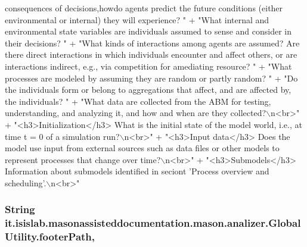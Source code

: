 \begin{DoxyCode}
{       consequences of decisions,howdo agents predict the future conditions (either environmental or internal)
       they will experience? "}
                                             +                            \textcolor{stringliteral}{"What internal and environmental
       state variables are individuals assumed to sense and consider in their decisions? "}
                                             +                            \textcolor{stringliteral}{"What kinds of interactions among
       agents are assumed? Are there direct interactions in which individuals encounter and affect others, or are
       interactions indirect, e.g., via competition for amediating resource? "}
                                             +                            \textcolor{stringliteral}{"What processes are modeled by
       assuming they are random or partly random? "}
                                             +                            \textcolor{stringliteral}{"Do the individuals form or
       belong to aggregations that affect, and are affected by, the individuals? "}
                                             +                            \textcolor{stringliteral}{"What data are collected from the
       ABM for testing, understanding, and analyzing it, and how and when are they collected?\(\backslash\)n<br>"}
                                             + \textcolor{stringliteral}{"<h3>Initialization</h3> What is the initial state of the
       model world, i.e., at time t = 0 of a simulation run?\(\backslash\)n<br>"}
                                             + \textcolor{stringliteral}{"<h3>Input data</h3> Does the model use input from external
       sources such as data files or other models to represent processes that change over time?\(\backslash\)n<br>"}
                                             + \textcolor{stringliteral}{"<h3>Submodels</h3> Information about submodels identified
       in seciont 'Process overview and scheduling'.\(\backslash\)n<br>"}
\end{DoxyCode}
\hypertarget{classit_1_1isislab_1_1masonassisteddocumentation_1_1mason_1_1analizer_1_1_global_utility_ae94176856fb4ef24dfaa70423f5fc3f9}{
\subsubsection[{footer\-Path}]{\setlength{\rightskip}{0pt plus 5cm}String it.\-isislab.\-masonassisteddocumentation.\-mason.\-analizer.\-Global\-Utility.\-footer\-Path\hspace{0.3cm}{\ttfamily [static]}, {\ttfamily [package]}}}\label{classit_1_1isislab_1_1masonassisteddocumentation_1_1mason_1_1analizer_1_1_global_utility_ae94176856fb4ef24dfaa70423f5fc3f9}
